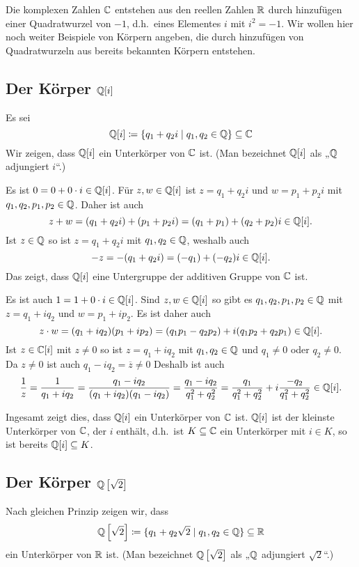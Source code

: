 Die komplexen Zahlen $\mathbb{C}$ entstehen aus den reellen Zahlen $\mathbb{R}$ durch hinzufügen einer Quadratwurzel von $-1$, d.h.\ eines Elementes $i$ mit $i^2 = -1$. Wir wollen hier noch weiter Beispiele von Körpern angeben, die durch hinzufügen von Quadratwurzeln aus bereits bekannten Körpern entstehen.






\subsection{Der Körper \texorpdfstring{$\mathbb{Q}[i]$}{Q[i]}}
Es sei
\[
 \mathbb{Q}[i]
 \coloneqq
 \{ q_1 + q_2 i \mid q_1, q_2 \in \mathbb{Q} \}
 \subseteq \mathbb{C}
\]
Wir zeigen, dass $\mathbb{Q}[i]$ ein Unterkörper von $\mathbb{C}$ ist. (Man bezeichnet $\mathbb{Q}[i]$ als „$\mathbb{Q}$ adjungiert $i$“.)

Es ist $0 = 0 + 0 \cdot i \in \mathbb{Q}[i]$. Für $z,w \in \mathbb{Q}[i]$ ist $z = q_1 + q_2 i$ und $w = p_1 + p_2 i$ mit $q_1, q_2, p_1, p_2 \in \mathbb{Q}$. Daher ist auch
\[
 z + w
 = (q_1 + q_2 i) + (p_1 + p_2 i)
 = (q_1 + p_1) + (q_2 + p_2) i
 \in \mathbb{Q}[i].
\]
Ist $z \in \mathbb{Q}$ so ist $z = q_1 + q_2 i$ mit $q_1, q_2 \in \mathbb{Q}$, weshalb auch
\[
 -z = -(q_1 + q_2 i) = (-q_1) + (-q_2) i \in \mathbb{Q}[i].
\]
Das zeigt, dass $\mathbb{Q}[i]$ eine Untergruppe der additiven Gruppe von $\mathbb{C}$ ist.

Es ist auch $1 = 1 + 0 \cdot i \in \mathbb{Q}[i]$. Sind $z, w \in \mathbb{Q}[i]$ so gibt es $q_1, q_2, p_1, p_2 \in \mathbb{Q}$ mit $z = q_1 + i q_2$ und $w = p_1 + i p_2$. Es ist daher auch
\[
 z \cdot w
 = (q_1 + iq_2)(p_1 + ip_2)
 = (q_1 p_1 - q_2 p_2) + i(q_1 p_2 + q_2 p_1)
 \in \mathbb{Q}[i].
\]
Ist $z \in \mathbb{C}[i]$ mit $z \neq 0$ so ist $z = q_1 + i q_2$ mit $q_1, q_2 \in \mathbb{Q}$ und $q_1 \neq 0$ oder $q_2 \neq 0$. Da $z \neq 0$ ist auch $q_1 - i q_2 = \overline{z} \neq 0$ Deshalb ist auch
\[
 \frac{1}{z}
 = \frac{1}{q_1 + i q_2}
 = \frac{q_1 - i q_2}{(q_1 + i q_2)(q_1 - i q_2)}
 = \frac{q_1 - i q_2}{q_1^2 + q_2^2}
 = \frac{q_1}{q_1^2 + q_2^2} + i \frac{-q_2}{q_1^2+q_2^2}
 \in \mathbb{Q}[i].
\]

Ingesamt zeigt dies, dass $\mathbb{Q}[i]$ ein Unterkörper von $\mathbb{C}$ ist. $\mathbb{Q}[i]$ ist der kleinste Unterkörper von $\mathbb{C}$, der $i$ enthält, d.h.\ ist $K \subseteq \mathbb{C}$ ein Unterkörper mit $i \in K$, so ist bereits $\mathbb{Q}[i] \subseteq K$.



\subsection{Der Körper \texorpdfstring{$\mathbb{Q}\left[\sqrt{2}\right]$}{Q[sqrt(2)]}}
Nach gleichen Prinzip zeigen wir, dass
\[
 \mathbb{Q}\left[\sqrt{2}\right] \coloneqq \{ q_1 + q_2 \sqrt{2} \mid q_1, q_2 \in \mathbb{Q} \} \subseteq \mathbb{R}
\]
ein Unterkörper von $\mathbb{R}$ ist. (Man bezeichnet $\mathbb{Q}\left[\sqrt{2}\right]$ als „$\mathbb{Q}$ adjungiert $\sqrt{2}$“.)

